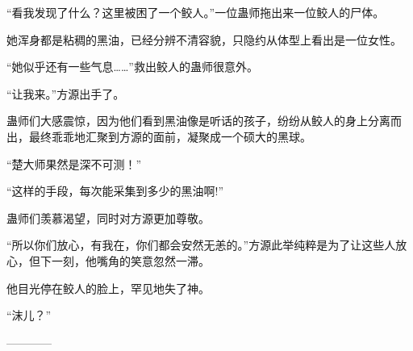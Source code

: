 \begin{this_body}
“看我发现了什么？这里被困了一个鲛人。”一位蛊师拖出来一位鲛人的尸体。

她浑身都是粘稠的黑油，已经分辨不清容貌，只隐约从体型上看出是一位女性。

“她似乎还有一些气息……”救出鲛人的蛊师很意外。

“让我来。”方源出手了。

蛊师们大感震惊，因为他们看到黑油像是听话的孩子，纷纷从鲛人的身上分离而出，最终乖乖地汇聚到方源的面前，凝聚成一个硕大的黑球。

“楚大师果然是深不可测！”

“这样的手段，每次能采集到多少的黑油啊!”

蛊师们羡慕渴望，同时对方源更加尊敬。

“所以你们放心，有我在，你们都会安然无恙的。”方源此举纯粹是为了让这些人放心，但下一刻，他嘴角的笑意忽然一滞。

他目光停在鲛人的脸上，罕见地失了神。

“沫儿？”

------------

\end{this_body}


